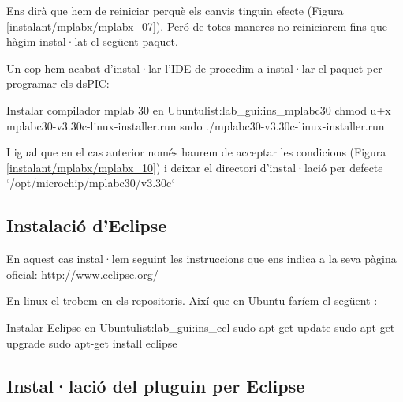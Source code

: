 
Ens dirà que hem de reiniciar perquè els canvis tinguin efecte (Figura \ref{instalant/mplabx/mplabx_07}). Peró de totes maneres no reiniciarem fins que hàgim instal·lat el següent paquet.


Un cop hem acabat d'instal·lar l'IDE de \MplabX procedim a instal·lar el paquet per programar els dsPIC:

\begin{code_bash}{Instalar compilador mplab 30 en Ubuntu}{list:lab_gui:ins_mplabc30}
chmod u+x mplabc30-v3.30c-linux-installer.run
sudo ./mplabc30-v3.30c-linux-installer.run
\end{code_bash}

I igual que en el cas anterior només haurem de acceptar les condicions (Figura \ref{instalant/mplabx/mplabx_10}) i deixar el directori d'instal·lació per defecte `/opt/microchip/mplabc30/v3.30c`
	


\subsection{Instalació d'Eclipse}

En aquest cas instal·lem seguint les instruccions que ens indica a la seva pàgina oficial:
\url{http://www.eclipse.org/}

En linux el trobem en els repositoris. Així que en Ubuntu faríem el següent :

\begin{code_bash}{Instalar Eclipse en Ubuntu}{list:lab_gui:ins_ecl}
sudo apt-get update
sudo apt-get upgrade
sudo apt-get install eclipse
\end{code_bash}

\subsection{Instal·lació del pluguin \RTDruid per Eclipse}

